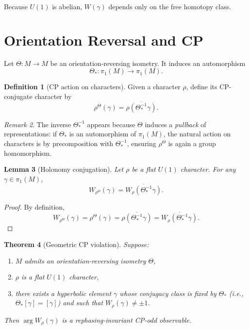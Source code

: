 \documentclass[12pt]{article}
\newtheorem{theorem}{Theorem}[section]
\newtheorem{lemma}[theorem]{Lemma}
\theoremstyle{definition}
\newtheorem{definition}[theorem]{Definition}
\theoremstyle{remark}
\newtheorem{remark}[theorem]{Remark}
\begin{document}
Because $U(1)$ is abelian, $W(\gamma)$ depends only on the
free homotopy class.

\section{Orientation Reversal and CP}

Let $\Theta : M \to M$ be an orientation-reversing isometry.
It induces an automorphism
\[
\Theta_* : \pi_1(M) \to \pi_1(M).
\]

\begin{definition}[CP action on characters]
Given a character $\rho$, define its CP-conjugate character by
\[
\rho^{\Theta}(\gamma)
=
\overline{\rho(\Theta_*^{-1}\gamma)}.
\]
\end{definition}

\begin{remark}
The inverse $\Theta_*^{-1}$ appears because $\Theta$ induces a
\emph{pullback} of representations: if $\Theta_*$ is an automorphism
of $\pi_1(M)$, the natural action on characters is by precomposition
with $\Theta_*^{-1}$, ensuring $\rho^\Theta$ is again a group homomorphism.
\end{remark}

\begin{lemma}[Holonomy conjugation]
Let $\rho$ be a flat $U(1)$ character.
For any $\gamma \in \pi_1(M)$,
\[
W_{\rho^{\Theta}}(\gamma)
=
\overline{W_{\rho}(\Theta_*^{-1}\gamma)}.
\]
\end{lemma}

\begin{proof}
By definition,
\[
W_{\rho^{\Theta}}(\gamma)
=
\rho^{\Theta}(\gamma)
=
\overline{\rho(\Theta_*^{-1}\gamma)}
=
\overline{W_{\rho}(\Theta_*^{-1}\gamma)}.
\]
\end{proof}

\begin{theorem}[Geometric CP violation]
Suppose:
\begin{enumerate}
\item $M$ admits an orientation-reversing isometry $\Theta$,
\item $\rho$ is a flat $U(1)$ character,
\item there exists a hyperbolic element $\gamma$ whose conjugacy class
is fixed by $\Theta_*$ (i.e., $\Theta_*[\gamma] = [\gamma]$) and such that
$W_\rho(\gamma) \neq \pm 1$.
\end{enumerate}
Then $\arg W_\rho(\gamma)$ is a rephasing-invariant
CP-odd observable.
\end{theorem}
\end{document}
